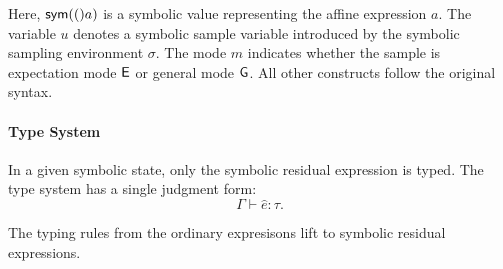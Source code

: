 Here, $\mathsf{sym}(()a)$ is a symbolic value representing the affine expression $a$. The variable $u$ denotes a symbolic sample variable introduced by the symbolic sampling environment $\sigma$. The mode $m$ indicates whether the sample is expectation mode $\mathsf{E}$ or general mode $\mathsf{G}$. All other constructs follow the original syntax.

\paragraph{Type System}

In a given symbolic state, only the symbolic residual expression is typed. The type system has a single judgment form:
\[
  \Gamma \vdash \hat e : \tau.
\]

The typing rules from the ordinary expresisons lift to symbolic residual expressions. 

